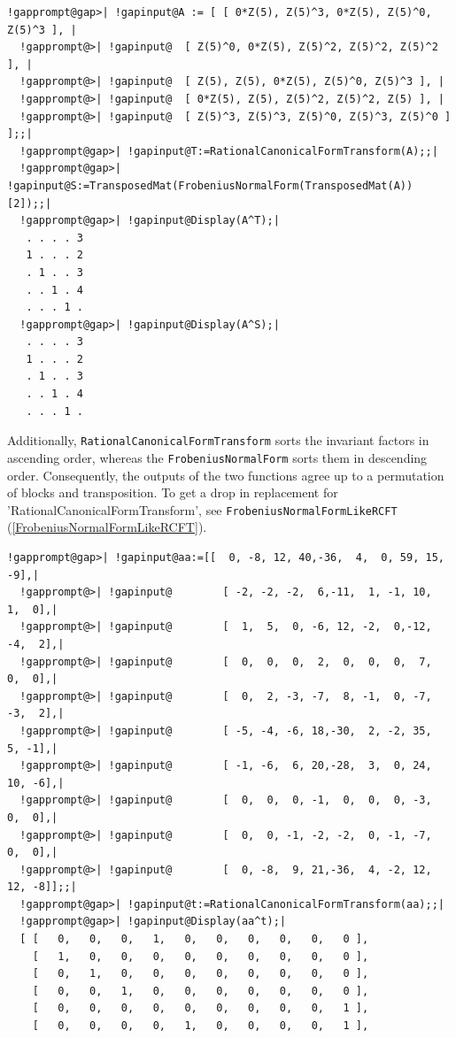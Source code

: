 \documentclass[a4paper,11pt]{report}
\begin{document}
{{{\begin{Verbatim}[commandchars=!@|,fontsize=\small,frame=single,label=Example]
  !gapprompt@gap>| !gapinput@A := [ [ 0*Z(5), Z(5)^3, 0*Z(5), Z(5)^0, Z(5)^3 ], |
  !gapprompt@>| !gapinput@  [ Z(5)^0, 0*Z(5), Z(5)^2, Z(5)^2, Z(5)^2 ], |
  !gapprompt@>| !gapinput@  [ Z(5), Z(5), 0*Z(5), Z(5)^0, Z(5)^3 ], |
  !gapprompt@>| !gapinput@  [ 0*Z(5), Z(5), Z(5)^2, Z(5)^2, Z(5) ], |
  !gapprompt@>| !gapinput@  [ Z(5)^3, Z(5)^3, Z(5)^0, Z(5)^3, Z(5)^0 ] ];;|
  !gapprompt@gap>| !gapinput@T:=RationalCanonicalFormTransform(A);;|
  !gapprompt@gap>| !gapinput@S:=TransposedMat(FrobeniusNormalForm(TransposedMat(A))[2]);;|
  !gapprompt@gap>| !gapinput@Display(A^T);|
   . . . . 3
   1 . . . 2
   . 1 . . 3
   . . 1 . 4
   . . . 1 .
  !gapprompt@gap>| !gapinput@Display(A^S);|
   . . . . 3
   1 . . . 2
   . 1 . . 3
   . . 1 . 4
   . . . 1 .
\end{Verbatim}
 

 Additionally, \texttt{RationalCanonicalFormTransform} sorts the invariant factors in ascending order, whereas the \texttt{FrobeniusNormalForm} sorts them in descending order. Consequently, the outputs of the two functions
agree up to a permutation of blocks and transposition. To get a drop in
replacement for 'RationalCanonicalFormTransform', see \texttt{FrobeniusNormalFormLikeRCFT} (\ref{FrobeniusNormalFormLikeRCFT}). 
\begin{Verbatim}[commandchars=!@|,fontsize=\small,frame=single,label=Example]
  !gapprompt@gap>| !gapinput@aa:=[[  0, -8, 12, 40,-36,  4,  0, 59, 15, -9],|
  !gapprompt@>| !gapinput@        [ -2, -2, -2,  6,-11,  1, -1, 10,  1,  0],|
  !gapprompt@>| !gapinput@        [  1,  5,  0, -6, 12, -2,  0,-12, -4,  2],|
  !gapprompt@>| !gapinput@        [  0,  0,  0,  2,  0,  0,  0,  7,  0,  0],|
  !gapprompt@>| !gapinput@        [  0,  2, -3, -7,  8, -1,  0, -7, -3,  2],|
  !gapprompt@>| !gapinput@        [ -5, -4, -6, 18,-30,  2, -2, 35,  5, -1],|
  !gapprompt@>| !gapinput@        [ -1, -6,  6, 20,-28,  3,  0, 24, 10, -6],|
  !gapprompt@>| !gapinput@        [  0,  0,  0, -1,  0,  0,  0, -3,  0,  0],|
  !gapprompt@>| !gapinput@        [  0,  0, -1, -2, -2,  0, -1, -7,  0,  0],|
  !gapprompt@>| !gapinput@        [  0, -8,  9, 21,-36,  4, -2, 12, 12, -8]];;|
  !gapprompt@gap>| !gapinput@t:=RationalCanonicalFormTransform(aa);;|
  !gapprompt@gap>| !gapinput@Display(aa^t);|
  [ [   0,   0,   0,   1,   0,   0,   0,   0,   0,   0 ],
    [   1,   0,   0,   0,   0,   0,   0,   0,   0,   0 ],
    [   0,   1,   0,   0,   0,   0,   0,   0,   0,   0 ],
    [   0,   0,   1,   0,   0,   0,   0,   0,   0,   0 ],
    [   0,   0,   0,   0,   0,   0,   0,   0,   0,   1 ],
    [   0,   0,   0,   0,   1,   0,   0,   0,   0,   1 ],

\end{Verbatim}}}}
\end{document}
